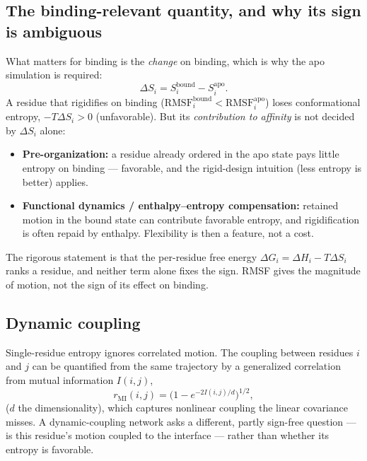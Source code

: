 \subsection{The binding-relevant quantity, and why its sign is ambiguous}
What matters for binding is the \emph{change} on binding, which is why the apo simulation is required:
\begin{equation}
\Delta S_i = S_i^{\mathrm{bound}} - S_i^{\mathrm{apo}} .
\end{equation}
A residue that rigidifies on binding ($\mathrm{RMSF}_i^{\mathrm{bound}} <
\mathrm{RMSF}_i^{\mathrm{apo}}$) loses conformational entropy, $-T\Delta S_i > 0$ (unfavorable). But
its \emph{contribution to affinity} is not decided by $\Delta S_i$ alone:
\begin{itemize}
\item \textbf{Pre-organization:} a residue already ordered in the apo state pays little entropy on
binding --- favorable, and the rigid-design intuition (less entropy is better) applies.
\item \textbf{Functional dynamics / enthalpy--entropy compensation:} retained motion in the bound
state can contribute favorable entropy, and rigidification is often repaid by enthalpy. Flexibility
is then a feature, not a cost.
\end{itemize}
The rigorous statement is that the per-residue free energy $\Delta G_i = \Delta H_i - T\Delta S_i$
ranks a residue, and neither term alone fixes the sign. RMSF gives the magnitude of motion, not the
sign of its effect on binding.

\subsection{Dynamic coupling}
Single-residue entropy ignores correlated motion. The coupling between residues $i$ and $j$ can be
quantified from the same trajectory by a generalized correlation from mutual information $I(i,j)$,
\begin{equation}
r_{\mathrm{MI}}(i,j) = \Big(1 - e^{-2 I(i,j)/d}\Big)^{1/2} ,
\end{equation}
($d$ the dimensionality), which captures nonlinear coupling the linear covariance misses. A
dynamic-coupling network asks a different, partly sign-free question --- is this residue's motion
coupled to the interface --- rather than whether its entropy is favorable.

